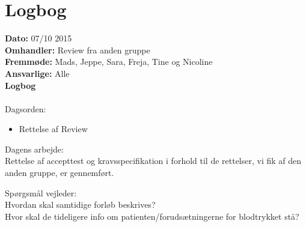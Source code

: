 \section{Logbog}

\textbf{Dato:} 07/10 2015\\
\textbf{Omhandler:} Review fra anden gruppe\\
\textbf{Fremmøde:} Mads, Jeppe, Sara, Freja, Tine og Nicoline\\
\textbf{Ansvarlige:} Alle\\
\textbf{Logbog}
\\
\\
Dagsorden:
\begin{itemize}
	\item Rettelse af Review
\end{itemize}

Dagens arbejde: \\
Rettelse af accepttest og kravsspecifikation i forhold til de rettelser, vi fik af den anden gruppe, er gennemført. 

Spørgsmål vejleder: \\
Hvordan skal samtidige forløb beskrives?\\
Hvor skal de tideligere info om patienten/forudsætningerne for blodtrykket stå? \\
\\

